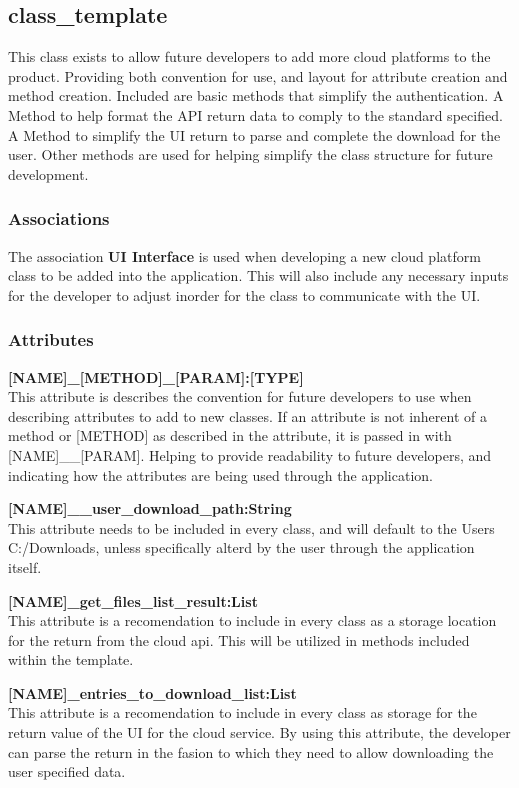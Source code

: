 \subsection{class\_template}
This class exists to allow future developers to add more cloud platforms to the product. Providing both convention for use, and layout 
for attribute creation and method creation. Included are basic methods that simplify the authentication. A Method to help format the 
API return data to comply to the standard specified. A Method to simplify the UI return to parse and complete the download for the user.
Other methods are used for helping simplify the class structure for future development. 

\subsubsection{Associations}
The association \textbf{UI Interface} is used when developing a new cloud platform class to be added into the application. This will also 
include any necessary inputs for the developer to adjust inorder for the class to communicate with the UI. 

\subsubsection{Attributes}
\textbf{[NAME]\_[METHOD]\_[PARAM]:[TYPE]} \\
This attribute is describes the convention for future developers to use when describing attributes to add to new classes. 
If an attribute is not inherent of a method or [METHOD] as described in the attribute, it is passed in with [NAME]\_\_[PARAM].
Helping to provide readability to future developers, and indicating how the attributes are being used through the application.

\textbf{[NAME]\_\_user\_download\_path:String} \\
This attribute needs to be included in every class, and will default to the Users C:/Downloads, unless specifically alterd by the user 
through the application itself. 

\textbf{[NAME]\_get\_files\_list\_result:List} \\
This attribute is a recomendation to include in every class as a storage location for the return from the cloud api. This will be 
utilized in methods included within the template. 

\textbf{[NAME]\_entries\_to\_download\_list:List} \\
This attribute is a recomendation to include in every class as storage for the return value of the UI for the cloud service. By using
this attribute, the developer can parse the return in the fasion to which they need to allow downloading the user specified data.

